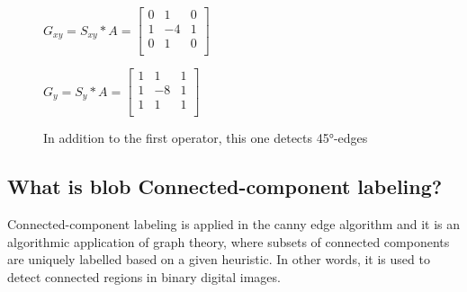 \begin{figure}[!htb]
    \centering
    \begin{minipage}{.5\textwidth}
        \centering
        $G_{xy} = S_{xy} * A =
        \left[ \begin{array}{rrr}
        0 & 1 & 0 \\
        1 & -4 & 1 \\
        0 & 1 & 0 \\
        \end{array}\right] $
    \end{minipage}%
    \begin{minipage}{.5\textwidth}
        \centering
        $G_{y} = S_{y} * A =
        \left[ \begin{array}{rrr}
        1 & 1 & 1 \\
        1 & -8 & 1 \\
        1 & 1 & 1 \\
        \end{array}\right] $
    \end{minipage}
    \caption{In addition to the first operator, this one detects 45°-edges}
\end{figure}




\subsection{What is blob Connected-component labeling?}
Connected-component labeling is applied in the canny edge algorithm and it is an algorithmic application of graph theory, where subsets of connected components are uniquely labelled based on a given heuristic. In other words, it is used to detect connected regions in binary digital images.
